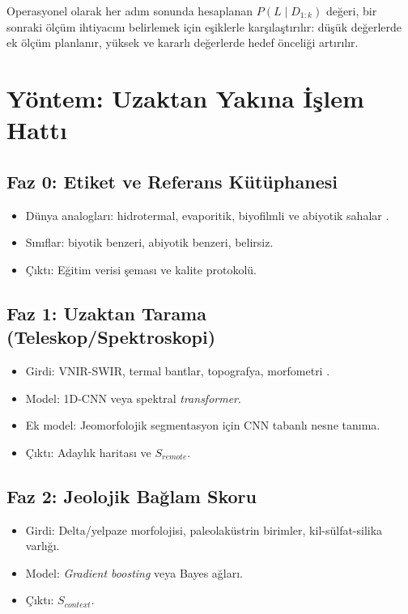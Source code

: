 \documentclass[12pt,a4paper]{article}
\begin{document}
Operasyonel olarak her adım sonunda hesaplanan $P(L\mid D_{1:k})$ değeri, bir sonraki ölçüm ihtiyacını belirlemek için eşiklerle karşılaştırılır: düşük değerlerde ek ölçüm planlanır, yüksek ve kararlı değerlerde hedef önceliği artırılır.

\section{Yöntem: Uzaktan Yakına İşlem Hattı}
\subsection{Faz 0: Etiket ve Referans Kütüphanesi}
\begin{itemize}
    \item Dünya analogları: hidrotermal, evaporitik, biyofilmli ve abiyotik sahalar \cite{kokaly2017}.
    \item Sınıflar: biyotik benzeri, abiyotik benzeri, belirsiz.
    \item Çıktı: Eğitim verisi şeması ve kalite protokolü.
\end{itemize}

\subsection{Faz 1: Uzaktan Tarama (Teleskop/Spektroskopi)}
\begin{itemize}
    \item Girdi: VNIR-SWIR, termal bantlar, topografya, morfometri \cite{clark1984}.
    \item Model: 1D-CNN veya spektral \textit{transformer}.
    \item Ek model: Jeomorfolojik segmentasyon için CNN tabanlı nesne tanıma.
    \item Çıktı: Adaylık haritası ve $S_{remote}$.
\end{itemize}

\subsection{Faz 2: Jeolojik Bağlam Skoru}
\begin{itemize}
    \item Girdi: Delta/yelpaze morfolojisi, paleolaküstrin birimler, kil-sülfat-silika varlığı.
    \item Model: \textit{Gradient boosting} veya Bayes ağları.
    \item Çıktı: $S_{context}$.
\end{itemize}
\end{document}
